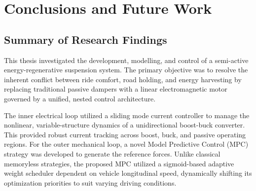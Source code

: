 \chapter{Conclusions and Future Work}
\label{chap:conclusion}

\section{Summary of Research Findings}
\label{sec:conclusion_summary}

This thesis investigated the development, modelling, and control of a semi-active energy-regenerative suspension system. The primary objective was to resolve the inherent conflict between ride comfort, road holding, and energy harvesting by replacing traditional passive dampers with a linear electromagnetic motor governed by a unified, nested control architecture. 

The inner electrical loop utilized a sliding mode current controller to manage the nonlinear, variable-structure dynamics of a unidirectional boost-buck converter. This provided robust current tracking across boost, buck, and passive operating regions. For the outer mechanical loop, a novel Model Predictive Control (MPC) strategy was developed to generate the reference forces. Unlike classical memoryless strategies, the proposed MPC utilized a sigmoid-based adaptive weight scheduler dependent on vehicle longitudinal speed, dynamically shifting its optimization priorities to suit varying driving conditions. 

